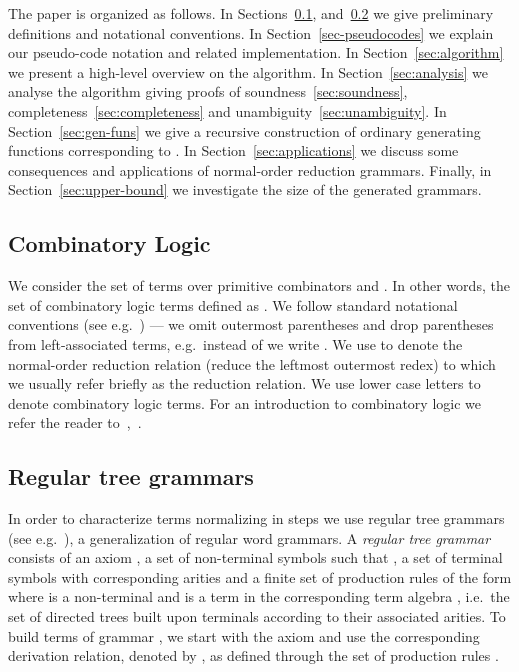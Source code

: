 \documentclass[11pt,a4paper]{amsart}
\theoremstyle{definition}
\begin{document}
The paper is organized as follows. In Sections~\ref{sec:combinatory-logic}, and~\ref{sec:regular-tree-grammars} we give preliminary definitions and notational conventions. In Section~\ref{sec-pseudocodes} we explain our pseudo-code notation and related implementation. In Section~\ref{sec:algorithm} we present a high-level overview on the algorithm. In Section~\ref{sec:analysis} we analyse the algorithm giving proofs of soundness~\ref{sec:soundness}, completeness~\ref{sec:completeness} and unambiguity~\ref{sec:unambiguity}. In Section~\ref{sec:gen-funs} we give a recursive construction of ordinary generating functions corresponding to . In Section~\ref{sec:applications} we discuss some consequences and applications of normal-order reduction grammars. Finally, in Section~\ref{sec:upper-bound} we investigate the size of the generated grammars.

\subsection{Combinatory Logic}\label{sec:combinatory-logic}
We consider the set of terms over primitive combinators  and . In other words, the set  of combinatory logic terms defined as . We follow standard notational conventions (see e.g.~\cite{barendregt1984}) --- we omit outermost parentheses and drop parentheses from left-associated terms, e.g.~instead of  we write . We use  to denote the normal-order reduction relation (reduce the leftmost outermost redex) to which we usually refer briefly as the reduction relation. We use lower case letters  to denote combinatory logic terms. For an introduction to combinatory logic we refer the
reader to~\cite{barendregt1984},~\cite{curry-feys1958}.

\subsection{Regular tree grammars}\label{sec:regular-tree-grammars}
In order to characterize terms normalizing in  steps we use
regular tree grammars (see e.g.~\cite{tata2007}), a generalization of regular
word grammars. A \emph{regular tree grammar}
 consists of an axiom , a set  of non-terminal
symbols such that , a set of terminal symbols  with
corresponding arities and a finite set of production rules  of the form
 where  is a non-terminal and  is a term in the corresponding term algebra
, i.e.~the set of directed trees built upon terminals
 according to their associated arities. To build terms of grammar
, we start with the axiom  and use the corresponding derivation relation,
denoted by , as defined through the set of production rules .
\end{document}
